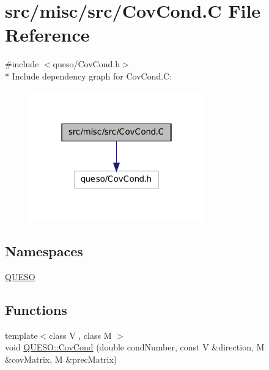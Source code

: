 \hypertarget{_cov_cond_8_c}{\section{src/misc/src/\-Cov\-Cond.C File Reference}
\label{_cov_cond_8_c}
}
{\ttfamily \#include $<$queso/\-Cov\-Cond.\-h$>$}\\*
Include dependency graph for Cov\-Cond.\-C\-:
\nopagebreak
\begin{figure}[H]
\begin{center}
\leavevmode
\includegraphics[width=214pt]{_cov_cond_8_c__incl}
\end{center}
\end{figure}
\subsection*{Namespaces}
\begin{DoxyCompactItemize}
\item 
\hyperlink{namespace_q_u_e_s_o}{Q\-U\-E\-S\-O}
\end{DoxyCompactItemize}
\subsection*{Functions}
\begin{DoxyCompactItemize}
\item 
{\footnotesize template$<$class V , class M $>$ }\\void \hyperlink{namespace_q_u_e_s_o_a1f8ccd7acd730666bd114f1f3ed33f82}{Q\-U\-E\-S\-O\-::\-Cov\-Cond} (double cond\-Number, const V \&direction, M \&cov\-Matrix, M \&prec\-Matrix)
\end{DoxyCompactItemize}
